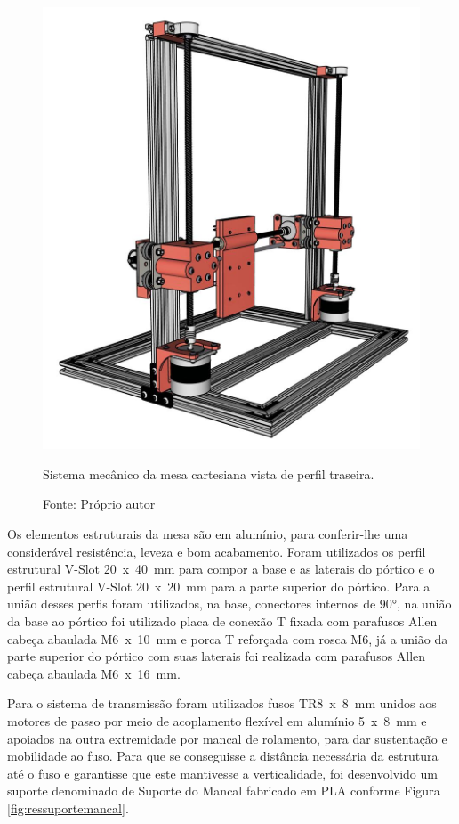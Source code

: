 \begin{figure}[H]
\centering
\includegraphics[scale = 0.35]{figuras/mesacartesianaperfiltraseira}
\caption{Sistema mecânico da mesa cartesiana vista de perfil traseira.}
\caption*{Fonte: Próprio autor}
\label{fig:mesacartesianaperfiltraseira}
\end{figure}
                
Os elementos estruturais da mesa são em alumínio, para conferir-lhe uma considerável resistência, 
leveza e bom acabamento. Foram utilizados os perfil estrutural V-Slot 20~x~40~mm para compor a base 
e as laterais do pórtico e o perfil estrutural V-Slot 20~x~20~mm para a parte superior do pórtico. 
Para a união desses perfis foram utilizados, na base, conectores internos de 90°, na união da 
base ao pórtico foi utilizado placa de conexão T fixada com parafusos Allen cabeça abaulada 
M6~x~10~mm e porca T reforçada com rosca M6, já a união da parte superior do pórtico com suas laterais foi 
realizada com parafusos Allen cabeça abaulada M6~x~16~mm.

\pagebreak
Para o sistema de transmissão foram utilizados fusos TR8~x~8~mm unidos aos motores de passo 
por meio de acoplamento flexível em alumínio 5~x~8~mm e apoiados na outra extremidade por 
mancal de rolamento, para dar sustentação e mobilidade ao fuso. Para que se conseguisse 
a distância necessária da estrutura até o fuso e garantisse que este mantivesse a 
verticalidade, foi desenvolvido um suporte denominado de Suporte do Mancal fabricado 
em \ac{PLA} conforme Figura \ref{fig:ressuportemancal}.

